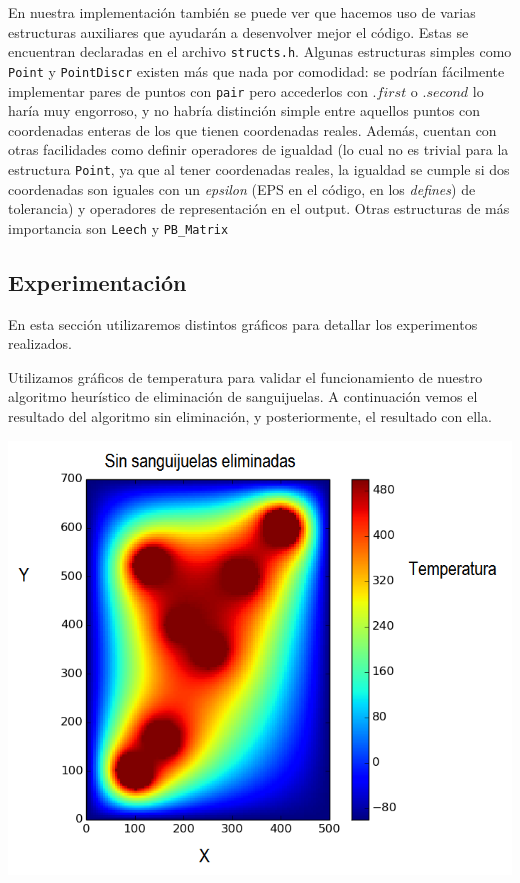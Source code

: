 En nuestra implementación también se puede ver que hacemos uso de varias estructuras auxiliares que ayudarán a desenvolver mejor el código. Estas se encuentran declaradas en el archivo \texttt{structs.h}. Algunas estructuras simples como \texttt{Point} y \texttt{PointDiscr} existen más que nada por comodidad: se podrían fácilmente implementar pares de puntos con \texttt{pair} pero accederlos con $.first$ o $.second$ lo haría muy engorroso, y no habría distinción simple entre aquellos puntos con coordenadas enteras de los que tienen coordenadas reales. Además, cuentan con otras facilidades como definir operadores de igualdad (lo cual no es trivial para la estructura \texttt{Point}, ya que al tener coordenadas reales, la igualdad se cumple si dos coordenadas son iguales con un \textit{epsilon} (EPS en el código, en los \textit{defines}) de tolerancia) y operadores de representación en el output. Otras estructuras de más importancia son \texttt{Leech} y \texttt{PB\_Matrix}

\subsection{Experimentación}

	En esta sección utilizaremos distintos gráficos para detallar los experimentos realizados. 

	Utilizamos gráficos de temperatura para validar el funcionamiento de nuestro algoritmo heurístico de eliminación de sanguijuelas. A continuación vemos el resultado del algoritmo sin eliminación, y posteriormente, el resultado con ella.

	\begin{center}
		\includegraphics[scale=0.5]{./img/test5_sinkill.png}
	\end{center}

